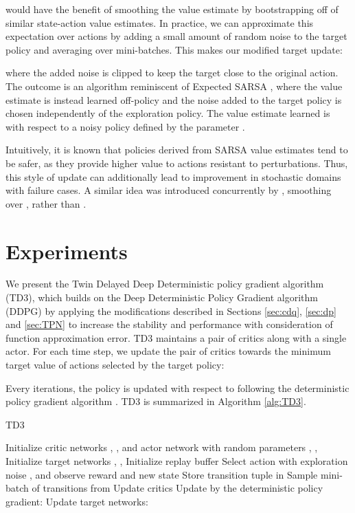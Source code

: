 \documentclass{article}
\begin{document}
would have the benefit of smoothing the value estimate by bootstrapping off of similar state-action value estimates. In practice, we can approximate this expectation over actions by adding a small amount of random noise to the target policy and averaging over mini-batches. This makes our modified target update: 

where the added noise is clipped to keep the target close to the original action. 
The outcome is an algorithm reminiscent of Expected SARSA \cite{van2009theoretical}, where the value estimate is instead learned off-policy and the noise added to the target policy is chosen independently of the exploration policy.
The value estimate learned is with respect to a noisy policy defined by the parameter . 

Intuitively, it is known that policies derived from SARSA value estimates tend to be safer, as they provide higher value to actions resistant to perturbations. Thus, this style of update can additionally lead to improvement in stochastic domains with failure cases. A similar idea was introduced concurrently by \citet{Smoothie}, smoothing over , rather than . 

\section{Experiments}


We present the Twin Delayed Deep Deterministic policy gradient algorithm (TD3), which builds on the Deep Deterministic Policy Gradient algorithm (DDPG) \cite{DDPG} by applying the modifications described in Sections \ref{sec:cdq}, \ref{sec:dp} and \ref{sec:TPN} to increase the stability and performance with consideration of function approximation error. 
TD3 maintains a pair of critics along with a single actor. For each time step, we update the pair of critics towards the minimum target value of actions selected by the target policy:

Every  iterations, the policy is updated with respect to  following the deterministic policy gradient algorithm \cite{DPG}. TD3 is summarized in Algorithm \ref{alg:TD3}.

\begin{algorithm}[tb]
   \caption{TD3}
   \label{alg:TD3}
\begin{algorithmic}
\STATE Initialize critic networks , , and actor network  with random parameters , , 
   \STATE Initialize target networks , , 
   \STATE Initialize replay buffer 
   \STATE Select action with exploration noise , 
   \STATE  and observe reward  and new state 
   \STATE Store transition tuple  in  
   \STATE 
   \STATE Sample mini-batch of  transitions  from 
\STATE 
\STATE 
\STATE Update critics 
   \STATE Update  by the deterministic policy gradient:
   \STATE 
   \STATE Update target networks:
   \STATE 
   \STATE 
   \ENDIF
   \ENDFOR
\end{algorithmic}
\end{algorithm}
\end{document}
